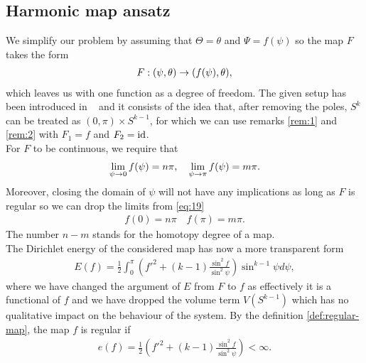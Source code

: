 \subsection{Harmonic map ansatz}
\label{sec:basic-setup}

We simplify our problem by assuming that $\Theta=\theta$ and
$\Psi=f(\psi)$ so the map $F$ takes the form
\begin{align}
  \label{eq:18}
  F:(\psi,\theta)\rightarrow(f(\psi),\theta),
\end{align}
which leaves us with one function as a degree of freedom. The given
setup has been introduced in ~\cite{Eells1964} and it consists of the
idea that, after removing the poles, $S^k$ can be treated as
$(0,\pi)\times S^{k-1}$, for which we can use remarks \ref{rem:1} and
\ref{rem:2} with $F_1=f$ and $F_2=\text{id}$.\\

For $F$ to be continuous, we require that
\begin{align}
  \label{eq:19}
  \lim_{\psi\rightarrow0}f(\psi)=n\pi,\quad\lim_{\psi\rightarrow\pi}f(\psi)=m\pi.
\end{align}
Moreover, closing the domain of $\psi$ will not have any implications
as long as $F$ is regular so we can drop the limits from \eqref{eq:19}
\begin{align}
  \label{eq:20}
  f(0)=n\pi\quad f(\pi)=m\pi.
\end{align}
The number $n-m$ stands for the homotopy degree of a
map.\\

The Dirichlet energy of the considered map has now a more transparent
form
\begin{align}
  \label{eq:21}
  E(f)=\frac{1}{2}\int_{0}^{\pi}
  \left(f'^2+(k-1)\frac{\sin^2f}{\sin^2\psi}\right) \sin^{k-1}\psi
  d\psi,
\end{align}
where we have changed the argument of $E$ from $F$ to $f$ as
effectively it is a functional of $f$ and we have dropped the volume
term $V(S^{k-1})$ which has no qualitative impact on the behaviour of
the system.
By the definition \ref{def:regular-map}, the map $f$ is regular if
\begin{align}
  \label{eq:23}
  e(f)=\frac{1}{2}\left(f'^2+(k-1)\frac{\sin^2f}{\sin^2\psi}\right)<\infty.
\end{align}

